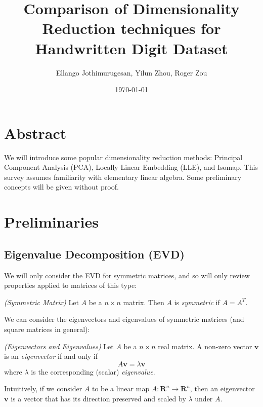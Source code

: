 \documentclass[11pt]{article}
\title{\textbf{Comparison of Dimensionality Reduction techniques for Handwritten Digit Dataset}}
\author{Ellango Jothimurugesan, Yilun Zhou, Roger Zou}
\date{\today}
\newenvironment{definition}[1][Definition]{\begin{trivlist}
\item[\hskip \labelsep {\bfseries #1}]}{\end{trivlist}}
\begin{document}
\maketitle


\section*{Abstract}
We will introduce some popular dimensionality reduction methods: Principal Component Analysis (PCA), Locally Linear Embedding (LLE), and Isomap. This survey assumes familiarity with elementary linear algebra. Some preliminary concepts will be given without proof.




\section*{Preliminaries}

\subsection*{Eigenvalue Decomposition (EVD)}

We will only consider the EVD for symmetric matrices, and so will only review properties applied to matrices of this type:
\begin{definition}
\emph{(Symmetric Matrix)}
Let $A$ be a $n \times n$ matrix. Then $A$ is \textit{symmetric} if $A = A^T$.
\end{definition}

We can consider the eigenvectors and eigenvalues of symmetric matrices (and square matrices in general):
\begin{definition}
\emph{(Eigenvectors and Eigenvalues)}
Let $A$ be a $n \times n$ real matrix. A non-zero vector $\mathbf{v}$ is an \textit{eigenvector} if and only if
\[A\mathbf{v} = \lambda \mathbf{v}\]
where $\lambda$ is the corresponding (scalar) \textit{eigenvalue}.
\end{definition}
Intuitively, if we consider $A$ to be a linear map $A: \mathbf{R}^n \rightarrow \mathbf{R}^n$, then an eigenvector $\mathbf{v}$ is a vector that has its direction preserved and scaled by $\lambda$ under $A$. \\
\end{document}
